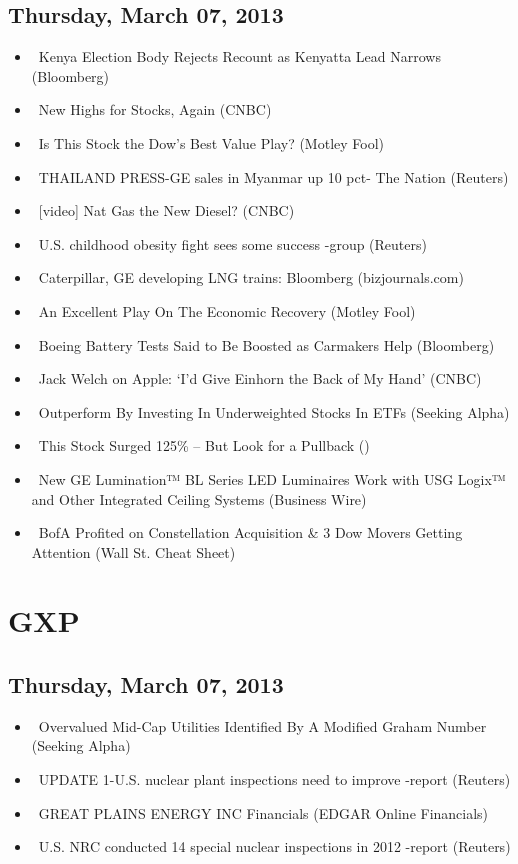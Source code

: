 \documentclass[11pt,asymmetric]{article}
\begin{document}
\subsection*{Thursday, March 07, 2013}
\begin{itemize}
\item\ Kenya Election Body Rejects Recount as Kenyatta Lead Narrows (Bloomberg)
\item\ New Highs for Stocks, Again (CNBC)
\item\ Is This Stock the Dow's Best Value Play? (Motley Fool)
\item\ THAILAND PRESS-GE sales in Myanmar up 10 pct- The Nation (Reuters)
\item\ [video] Nat Gas the New Diesel? (CNBC)
\item\ U.S. childhood obesity fight sees some success -group (Reuters)
\item\ Caterpillar, GE developing LNG trains: Bloomberg (bizjournals.com)
\item\ An Excellent Play On The Economic Recovery (Motley Fool)
\item\ Boeing Battery Tests Said to Be Boosted as Carmakers Help (Bloomberg)
\item\ Jack Welch on Apple: `I'd Give Einhorn the Back of My Hand' (CNBC)
\item\ Outperform By Investing In Underweighted Stocks In ETFs (Seeking Alpha)
\item\ This Stock Surged 125\% -- But Look for a Pullback ()
\item\ New GE Lumination™ BL Series LED Luminaires Work with USG Logix™ and Other Integrated Ceiling Systems (Business Wire)
\item\ BofA Profited on Constellation Acquisition \& 3 Dow Movers Getting Attention (Wall St. Cheat Sheet)
\end{itemize}

\section*{GXP}

\subsection*{Thursday, March 07, 2013}
\begin{itemize}
\item\ Overvalued Mid-Cap Utilities Identified By A Modified Graham Number (Seeking Alpha)
\item\ UPDATE 1-U.S. nuclear plant inspections need to improve -report (Reuters)
\item\ GREAT PLAINS ENERGY INC Financials (EDGAR Online Financials)
\item\ U.S. NRC conducted 14 special nuclear inspections in 2012 -report (Reuters)
\end{itemize}
\end{document}
